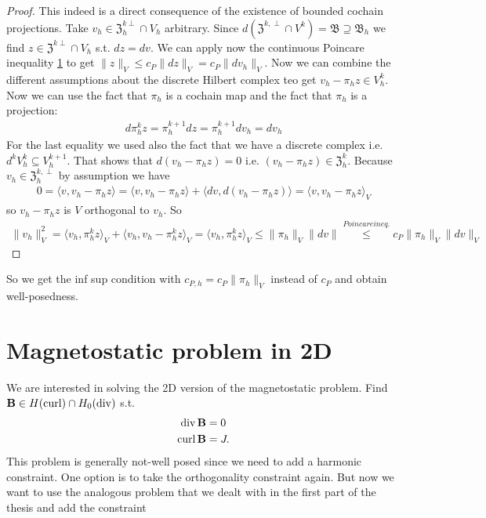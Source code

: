 \documentclass[../master_thesis.tex]{subfiles}
\begin{document}
\begin{proof}
    This indeed is a direct consequence of the existence of bounded cochain projections.
    Take $v_h \in \mathfrak{Z}_h^{k\perp}\cap V_h$ arbitrary. 
    Since $d (\mathfrak{Z}^{k,\perp} \cap V^k) = \mathfrak{B} \supseteq \mathfrak{B}_h$ we find 
    $z\in \mathfrak{Z}^{k\perp}\cap V_h$ s.t. $dz = dv$. We can apply now the continuous 
    Poincare inequality \ref{} to get $\lVert z \rVert _V \leq c_P \lVert dz \rVert _V = c_P \lVert dv_h \rVert _V$.
    Now we can combine the different assumptions about the discrete Hilbert complex teo get 
    $v_h - \pi_h z \in V_h^k$. Now we can use the fact that $\pi_h$ is a cochain map 
    and the fact that $\pi_h$ is a projection:
    \begin{align*}
        d\pi^k_h z = \pi^{k+1}_h dz = \pi^{k+1}_h dv_h = dv_h
    \end{align*}
    For the last equality we used also the fact that we have a discrete complex i.e. $d^k V^k_h \subseteq V^{k+1}_h$.
    That shows that $d(v_h - \pi_h z) = 0$ i.e. $(v_h - \pi_h z) \in \mathfrak{Z}_h^k$.
    Because $v_h \in \mathfrak{Z}_h^{k,\perp}$ by assumption we have 
    \begin{align*}
        0 = \langle v, v_h - \pi_h z \rangle = \langle v, v_h - \pi_h z \rangle + \langle dv, d(v_h - \pi_h z) \rangle
            = \langle v, v_h - \pi_h z \rangle _V
    \end{align*}
    so $v_h - \pi_h z$ is $V$ orthogonal to $v_h$. So 
    \begin{align*}
        \lVert v_h \rVert _V^2 = \langle v_h, \pi_h^k z \rangle _V + \langle v_h, v_h - \pi_h^k z\rangle _V 
        = \langle v_h, \pi_h^k z \rangle _V \leq \lVert \pi_h \rVert _V \lVert dv \rVert
        \stackrel{Poincare ineq.}{\leq} c_P \lVert \pi_h \rVert _V \lVert dv \rVert _V
    \end{align*}
\end{proof}

So we get the inf sup condition with $c_{P,h} = c_P \lVert \pi_h \rVert _V$ instead of $c_P$ 
and obtain well-posedness.

\section{Magnetostatic problem in 2D}

We are interested in solving the 2D version of the magnetostatic problem. 
Find $\mathbf{B} \in H(\operatorname{curl}) \cap H_0(\operatorname{div})$ s.t.
\begin{align*}
    \operatorname{div} \mathbf{B} &= 0
    \\ \operatorname{curl} \mathbf{B} &= J.
\end{align*}
This problem is generally not-well posed since we need to add a harmonic constraint. 
One option is to take the orthogonality constraint again. But now we want to use the 
analogous problem that we dealt with in the first part of the thesis and add the 
constraint 
\begin{align*}
    
\end{align*}
\end{document}
